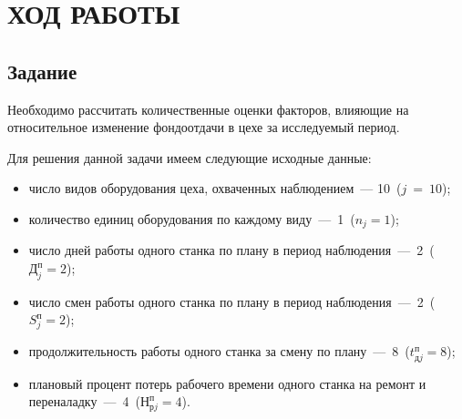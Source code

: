 \section{ХОД РАБОТЫ}

\subsection{Задание}

Необходимо рассчитать количественные оценки факторов, влияющие
на относительное изменение фондоотдачи в цехе за исследуемый период.

Для решения данной задачи имеем следующие исходные данные:

\begin{itemize}
  \item число видов оборудования цеха, охваченных наблюдением~--- 10~($ j~=~10 $);
  \item количество единиц оборудования по каждому виду~---~1~($ n_j = 1$);
  \item число дней работы одного станка по плану в период наблюдения~---~2~($ \text{Д}_j^{\text{п}} = 2 $);
  \item число смен работы одного станка по плану в период наблюдения~---~2~($ S^\text{п}_j = 2 $);
  \item продолжительность работы одного станка за смену по плану~---~8~($ t^\text{п}_{\text{д}j} = 8 $);
  \item плановый процент потерь рабочего времени одного станка на ремонт и
    переналадку~---~4~($ \text{Н}^\text{п}_{\text{р}j} = 4 $).
\end{itemize}

